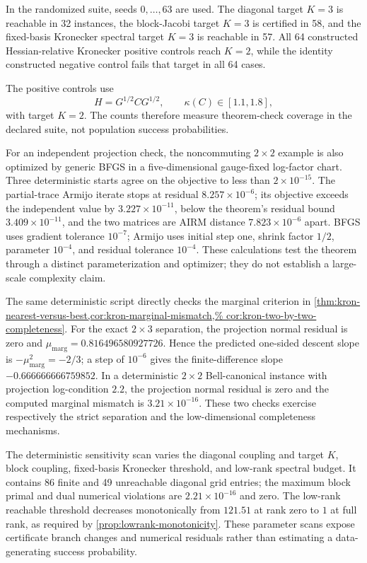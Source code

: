 In the randomized suite, seeds \(0,\ldots,63\) are used.  The diagonal target
\(K=3\) is reachable in 32 instances, the block-Jacobi target \(K=3\) is
certified in 58, and the fixed-basis Kronecker spectral target \(K=3\) is
reachable in 57.  All 64 constructed Hessian-relative Kronecker positive
controls reach \(K=2\), while the identity constructed negative control fails
that target in all 64 cases.

The positive controls use
\[
  H=G^{1/2}CG^{1/2},
  \qquad
  \kappa(C)\in[1.1,1.8],
\]
with target \(K=2\).  The counts therefore measure theorem-check coverage in
the declared suite, not population success probabilities.

For an independent projection check, the noncommuting \(2\times2\) example is
also optimized by generic BFGS in a five-dimensional gauge-fixed log-factor
chart.  Three deterministic starts agree on the objective to less than
\(2\times10^{-15}\).  The partial-trace Armijo iterate stops at residual
\(8.257\times10^{-6}\); its objective exceeds the independent value by
\(3.227\times10^{-11}\), below the theorem's residual bound
\(3.409\times10^{-11}\), and the two matrices are AIRM distance
\(7.823\times10^{-6}\) apart.  BFGS uses gradient tolerance \(10^{-7}\);
Armijo uses initial step one, shrink factor \(1/2\), parameter \(10^{-4}\),
and residual tolerance \(10^{-4}\).  These calculations test the theorem
through a distinct parameterization and optimizer; they do not establish a
large-scale complexity claim.

The same deterministic script directly checks the marginal criterion in
\cref{thm:kron-nearest-versus-best,cor:kron-marginal-mismatch,%
cor:kron-two-by-two-completeness}.  For the exact \(2\times3\) separation,
the projection normal residual is zero and
\(\mu_{\mathrm{marg}}=0.816496580927726\).  Hence the predicted one-sided
descent slope is \(-\mu_{\mathrm{marg}}^2=-2/3\); a step of \(10^{-6}\)
gives the finite-difference slope \(-0.666666666759852\).  In a deterministic
\(2\times2\) Bell-canonical instance with projection log-condition \(2.2\),
the projection normal residual is zero and the computed marginal mismatch is
\(3.21\times10^{-16}\).  These two checks exercise respectively the strict
separation and the low-dimensional completeness mechanisms.

The deterministic sensitivity scan varies the diagonal coupling and target
\(K\), block coupling, fixed-basis Kronecker threshold, and low-rank spectral
budget.  It contains 86 finite and 49 unreachable diagonal grid entries; the
maximum block primal and dual numerical violations are
\(2.21\times10^{-16}\) and zero.  The low-rank reachable threshold decreases
monotonically from \(121.51\) at rank zero to \(1\) at full rank, as required
by \cref{prop:lowrank-monotonicity}.  These parameter scans expose certificate
branch changes and numerical residuals rather than estimating a data-generating
success probability.

